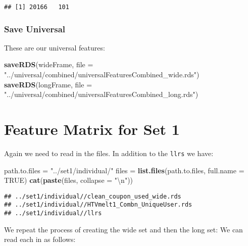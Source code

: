 \documentclass[10pt]{report}
\newenvironment{Shaded}{}{}
\newcommand{\KeywordTok}[1]{\textcolor[rgb]{0.00,0.44,0.13}{\textbf{{#1}}}}
\newcommand{\DataTypeTok}[1]{\textcolor[rgb]{0.56,0.13,0.00}{{#1}}}
\newcommand{\CharTok}[1]{\textcolor[rgb]{0.25,0.44,0.63}{{#1}}}
\newcommand{\StringTok}[1]{\textcolor[rgb]{0.25,0.44,0.63}{{#1}}}
\newcommand{\OtherTok}[1]{\textcolor[rgb]{0.00,0.44,0.13}{{#1}}}
\newcommand{\NormalTok}[1]{{#1}}
\begin{document}
\begin{verbatim}
## [1] 20166   101
\end{verbatim}

\subsubsection{Save Universal}\label{save-universal}

These are our universal features:

\begin{Shaded}
\begin{Highlighting}[]
\KeywordTok{saveRDS}\NormalTok{(wideFrame, }\DataTypeTok{file =} \StringTok{"../universal/combined/universalFeaturesCombined_wide.rds"}\NormalTok{)}
\KeywordTok{saveRDS}\NormalTok{(longFrame, }\DataTypeTok{file =} \StringTok{"../universal/combined/universalFeaturesCombined_long.rds"}\NormalTok{)}
\end{Highlighting}
\end{Shaded}

\section{Feature Matrix for Set 1}\label{feature-matrix-for-set-1}

Again we need to read in the files. In addition to the \verb!llrs! we
have:

\begin{Shaded}
\begin{Highlighting}[]
\NormalTok{path.to.files =}\StringTok{ "../set1/individual/"}
\NormalTok{files =}\StringTok{ }\KeywordTok{list.files}\NormalTok{(path.to.files, }\DataTypeTok{full.name =} \OtherTok{TRUE}\NormalTok{)}
\KeywordTok{cat}\NormalTok{(}\KeywordTok{paste}\NormalTok{(files, }\DataTypeTok{collapse =} \StringTok{"}\CharTok{\textbackslash{}n}\StringTok{"}\NormalTok{))}
\end{Highlighting}
\end{Shaded}

\begin{verbatim}
## ../set1/individual//clean_coupon_used_wide.rds
## ../set1/individual//HTVmelt1_Combn_UniqueUser.rds
## ../set1/individual//llrs
\end{verbatim}

We repeat the process of creating the wide set and then the long set: We
can read each in as follows:
\end{document}
